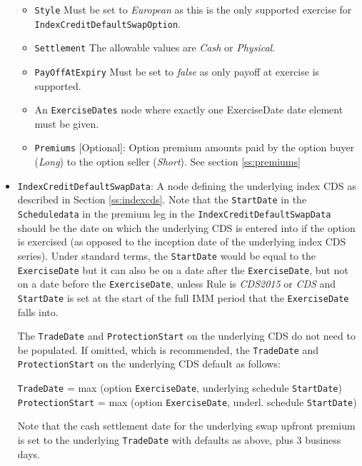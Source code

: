 \begin{itemize}
\begin{itemize}
\item  \lstinline!Style!  Must be set to \emph{European} as this is the only supported exercise for \lstinline!IndexCreditDefaultSwapOption!. 

\item  \lstinline!Settlement! The allowable values are \emph{Cash} or \emph{Physical}.

\item \lstinline!PayOffAtExpiry! Must be set to \emph{false} as only payoff at exercise is supported.

\item An \lstinline!ExerciseDates! node where exactly one ExerciseDate date element must be given. 

\item  \lstinline!Premiums! [Optional]: Option premium amounts paid by the option buyer (\emph{Long}) to the option seller (\emph{Short}). See section \ref{ss:premiums}

\end{itemize}


\item
\lstinline!IndexCreditDefaultSwapData!: A node defining the underlying index CDS as described in Section \ref{ss:indexcds}. Note that the \lstinline!StartDate! in the \lstinline!Scheduledata! in the premium leg in the \lstinline!IndexCreditDefaultSwapData! should be the date on which the underlying CDS is entered into if the option is exercised (as opposed to the inception date of the underlying index CDS series). Under standard terms, the \lstinline!StartDate! would be equal to the \lstinline!ExerciseDate! but it can also be on a date after the \lstinline!ExerciseDate!, but not on a date before the  \lstinline!ExerciseDate!, unless Rule is \emph{CDS2015} or \emph{CDS} and \lstinline!StartDate! is set at the start of the full IMM period that the \lstinline!ExerciseDate! falls into. 

The \lstinline!TradeDate! and \lstinline!ProtectionStart! on the underlying CDS do not need to be populated. If omitted, which is recommended, the \lstinline!TradeDate! and \lstinline!ProtectionStart! on the underlying CDS default as follows:

 \lstinline!TradeDate! = max (option \lstinline!ExerciseDate!, underlying schedule \lstinline!StartDate!) \\
 \lstinline!ProtectionStart! = max (option \lstinline!ExerciseDate!, underl. schedule \lstinline!StartDate!)

Note that the  cash settlement date for the underlying swap upfront premium is set to the underlying \lstinline!TradeDate! with defaults as above, plus 3 business days. 


\end{itemize}
